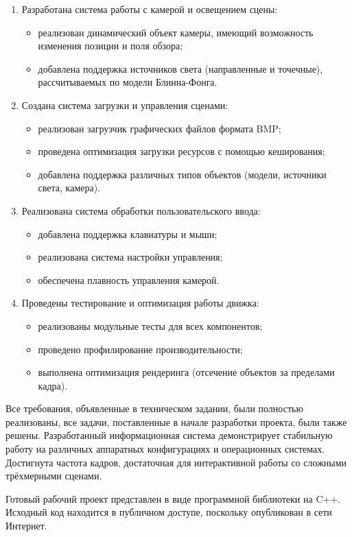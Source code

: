 \begin{enumerate}
    \item Разработана система работы с камерой и освещением сцены:
    \begin{itemize}
        \item реализован динамический объект камеры, имеющий возможность изменения позиции и поля обзора;
        \item добавлена поддержка источников света (направленные и точечные), рассчитываемых по модели Блинна-Фонга.
    \end{itemize}
    
    \item Создана система загрузки и управления сценами:
    \begin{itemize}
        \item реализован загрузчик графических файлов формата BMP;
        \item проведена оптимизация загрузки ресурсов с помощью кеширования;
        \item добавлена поддержка различных типов объектов (модели, источники света, камера).
    \end{itemize}
    
    \item Реализована система обработки пользовательского ввода:
    \begin{itemize}
        \item добавлена поддержка клавиатуры и мыши;
        \item реализована система настройки управления;
        \item обеспечена плавность управления камерой.
    \end{itemize}
    
    \item Проведены тестирование и оптимизация работы движка:
    \begin{itemize}
        \item реализованы модульные тесты для всех компонентов;
        \item проведено профилирование производительности;
        \item выполнена оптимизация рендеринга (отсечение объектов за пределами кадра).
    \end{itemize}
\end{enumerate}

Все требования, объявленные в техническом задании, были полностью реализованы, все задачи, поставленные в начале разработки проекта, были также решены. Разработанный информационная система демонстрирует стабильную работу на различных аппаратных конфигурациях и операционных системах. Достигнута частота кадров, достаточная для интерактивной работы со сложными трёхмерными сценами.

Готовый рабочий проект представлен в виде программной библиотеки на C++. Исходный код находится в публичном доступе, поскольку опубликован в сети Интернет.
